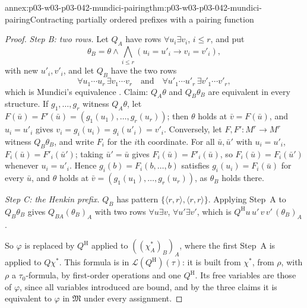\begin{annexitem}{annex:p03-w03-p03-042-mundici-pairing}{thm:p03-w03-p03-042-mundici-pairing}{Contracting partially ordered prefixes with a pairing function}
\begin{proof}
\emph{Step B: two rows.}  Let \(Q_A\) have rows \(\forall u_i\exists
v_i\), \(i\le r\), and put
\[
 \theta_B=\theta\wedge\bigwedge_{i\le r}(u_i=u'_i\to v_i=v'_i),
\]
with new \(u'_i,v'_i\), and let \(Q_B\) have the two rows
\[
 \forall u_1\cdots u_r\,\exists v_1\cdots v_r\quad\text{and}\quad
 \forall u'_1\cdots u'_r\,\exists v'_1\cdots v'_r,
\]
which is Mundici's equivalence
\cite[p.~214]{Mundici1985OtherQuantifiers}.  Claim: \(Q_A\theta\) and
\(Q_B\theta_B\) are equivalent in every structure.  If \(g_1,\ldots,g_r\)
witness \(Q_A\theta\), let \(F(\bar u)=F'(\bar u)=(g_1(u_1),\ldots,
g_r(u_r))\); then \(\theta\) holds at \(\bar v=F(\bar u)\), and
\(u_i=u'_i\) gives \(v_i=g_i(u_i)=g_i(u'_i)=v'_i\).  Conversely, let
\(F,F':M^r\to M^r\) witness \(Q_B\theta_B\), and write \(F_i\) for the
\(i\)th coordinate.  For all \(\bar u,\bar u'\) with \(u_i=u'_i\),
\(F_i(\bar u)=F'_i(\bar u')\); taking \(\bar u'=\bar u\) gives
\(F_i(\bar u)=F'_i(\bar u)\), so \(F_i(\bar u)=F_i(\bar u')\) whenever
\(u_i=u'_i\).  Hence \(g_i(b)=F_i(b,\ldots,b)\) satisfies
\(g_i(u_i)=F_i(\bar u)\) for every \(\bar u\), and \(\theta\) holds at
\(\bar v=(g_1(u_1),\ldots,g_r(u_r))\), as \(\theta_B\) holds there.

\emph{Step C: the Henkin prefix.}  \(Q_B\) has pattern
\(\{\langle r,r\rangle,\langle r,r\rangle\}\).  Applying Step~A to
\(Q_B\theta_B\) gives \(Q_{BA}(\theta_B)_A\) with two rows
\(\forall u\exists v\), \(\forall u'\exists v'\), which is
\(Q^{\mathrm H}u\,u'\,v\,v'\,(\theta_B)_A\).

So \(\varphi\) is replaced by \(Q^{\mathrm H}\) applied to
\(((\chi^\ast_A)_B)_A\), where the first Step~A is applied to
\(Q\chi^\ast\).  This formula is in \(\mathscr L(Q^{\mathrm H})(\tau)\):
it is built from \(\chi^\ast\), from \(\rho\), with \(\rho\) a
\(\tau_0\)-formula, by first-order operations and one \(Q^{\mathrm H}\).
Its free variables are those of \(\varphi\), since all variables
introduced are bound, and by the three claims it is equivalent to
\(\varphi\) in \(\mathfrak M\) under every assignment.
\end{proof}
\end{annexitem}

